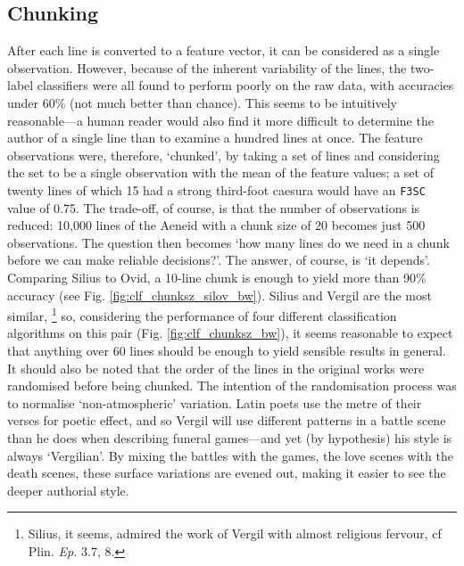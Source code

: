 \documentclass[11pt,a4paper]{scrartcl} %
\begin{document}
{\subsection{Chunking}

After each line is converted to a feature vector, it can be considered as a single observation. However, because of the inherent variability of the lines, the two-label classifiers were all found to perform poorly on the raw data, with accuracies under 60\% (not much better than chance). This seems to be intuitively reasonable---a human reader would also find it more difficult to determine the author of a single line than to examine a hundred lines at once. The feature observations were, therefore, `chunked', by taking a set of lines and considering the set to be a single observation with the mean of the feature values; a set of twenty lines of which 15 had a strong third-foot caesura would have an \texttt{F3SC} value of 0.75. The trade-off, of course, is that the number of observations is reduced: 10,000 lines of the Aeneid with a chunk size of 20 becomes just 500 observations. The question then becomes `how many lines do we need in a chunk before we can make reliable decisions?'. The answer, of course, is `it depends'. Comparing Silius to Ovid, a 10-line chunk is enough to yield more than 90\% accuracy (see Fig. \ref{fig:clf_chunksz_silov_bw}). Silius and Vergil are the most similar,%
\footnote{Silius, it seems, admired the work of Vergil with almost religious fervour, cf Plin. \textit{Ep.} 3.7, 8.}
so, considering the performance of four different classification algorithms on this pair (Fig. \ref{fig:clf_chunksz_bw}), it seems reasonable to expect that anything over 60 lines should be enough to yield sensible results in general. It should also be noted that the order of the lines in the original works were randomised before being chunked. The intention of the randomisation process was to normalise `non-atmospheric' variation. Latin poets use the metre of their verses for poetic effect, and so Vergil will use different patterns in a battle scene than he does when describing funeral games---and yet (by hypothesis) his style is always `Vergilian'. By mixing the battles with the games, the love scenes with the death scenes, these surface variations are evened out, making it easier to see the deeper authorial style.

}
\end{document}
